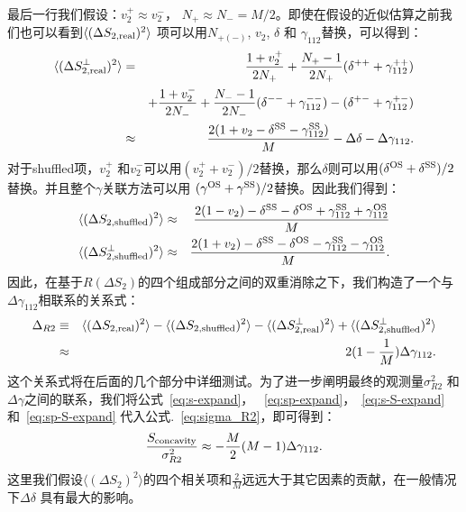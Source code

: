 最后一行我们假设：$v_2^+ \approx v_2^-$， $N_+ \approx N_- = M/2$。即使在假设的近似估算之前我们也可以看到$\langle(\Delta S_{2,\rm real})^2\rangle$ 项可以用$N_{+(-)}$, $v_2$, $\delta$ 和 $\gamma_{112}$替换，可以得到：
\begin{eqnarray}
\langle(\Delta S_{2,\rm real}^\perp)^2\rangle 
&=& \frac{1+v_2^+}{2N_+} + \frac{N_+-1}{2N_+}(\delta^{++}+\gamma^{++}_{112})  \nonumber \\
 && +\frac{1+v_2^-}{2N_-} + \frac{N_--1}{2N_-}(\delta^{--}+\gamma^{--}_{112}) - (\delta^{+-}+\gamma^{+-}_{112}) \\
&\approx& \frac{2(1+v_2-\delta^{\rm SS}-\gamma_{112}^{\rm SS})}{M} - \Delta\delta - \Delta\gamma_{112}.
\label{eq:sp-expand}
\end{eqnarray}
对于shuffled项，$v_2^+$ 和$v_2^-$可以用$(v_2^+ + v_2^-)/2$替换，那么$\delta$则可以用$(\delta^{\rm OS}+\delta^{\rm SS})/2$替换。并且整个$\gamma$关联方法可以用 $(\gamma^{\rm OS}+\gamma^{\rm SS})/2$替换。因此我们得到：
\begin{eqnarray}
\langle(\Delta S_{2,\rm shuffled})^2\rangle 
&\approx& \frac{2(1-v_2)-\delta^{\rm SS}-\delta^{\rm OS}+\gamma_{112}^{\rm SS}+\gamma_{112}^{\rm OS}}{M}
\label{eq:s-S-expand}\\
\langle(\Delta S_{2,\rm shuffled}^\perp)^2\rangle 
&\approx& \frac{2(1+v_2)-\delta^{\rm SS}-\delta^{\rm OS}-\gamma_{112}^{\rm SS}-\gamma_{112}^{\rm OS}}{M}.
\label{eq:sp-S-expand}
\end{eqnarray}
因此，在基于$R(\Delta S_2)$的四个组成部分之间的双重消除之下，我们构造了一个与 $\Delta\gamma_{112}$相联系的关系式：
\begin{eqnarray}
\Delta_{R2} & \equiv &\langle (\Delta S_{2,\rm real})^2 \rangle - \langle (\Delta S_{2,\rm shuffled})^2 \rangle - \langle (\Delta S^{\perp}_{2,\rm real})^2 \rangle  + \langle (\Delta S^{\perp}_{2,\rm shuffled})^2 \rangle   \nonumber \\
 &\approx &2(1-\frac{1}{M})\Delta \gamma_{112}.
\label{eq:relation1}
\end{eqnarray}
这个关系式将在后面的几个部分中详细测试。为了进一步阐明最终的观测量$\sigma^2_{R2}$ 和$\Delta\gamma$之间的联系，我们将公式~\ref{eq:s-expand}， ~\ref{eq:sp-expand}，~\ref{eq:s-S-expand} 和~\ref{eq:sp-S-expand} 代入公式.~\ref{eq:sigma_R2}，即可得到：
\begin{equation}
\frac{S_{\rm concavity}}{\sigma_{R2}^2} \approx -\frac{M}{2}(M-1)\Delta\gamma_{112}.    
\label{eq:relation2}
\end{equation}
这里我们假设$\langle (\Delta S_2)^2\rangle$的四个相关项和$\frac{2}{M}$远远大于其它因素的贡献，在一般情况下$\Delta\delta$ 具有最大的影响。


